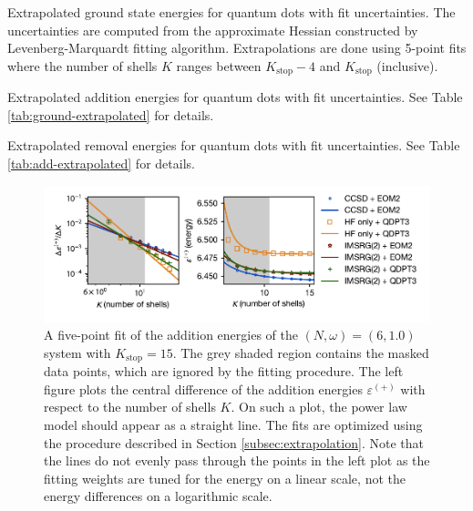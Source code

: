 \begin{table}
  \centering \caption{Extrapolated ground state energies for quantum
  dots with fit uncertainties.  The uncertainties are computed from
  the approximate Hessian constructed by Levenberg-Marquardt fitting
  algorithm.  Extrapolations are done using 5-point fits where the
  number of shells $K$ ranges between $K_{\text{stop}} - 4$ and
  $K_{\text{stop}}$
  (inclusive).}  \label{tab:ground-extrapolated} 
\end{table}

\begin{table}
  \centering
  \caption{Extrapolated addition energies for quantum dots with fit uncertainties.  See Table \ref{tab:ground-extrapolated} for details.}
  \label{tab:add-extrapolated}
  
\end{table}

\begin{table}
  \centering
  \caption{Extrapolated removal energies for quantum dots with fit uncertainties.  See Table \ref{tab:add-extrapolated} for details.}
  \label{tab:rm-extrapolated}
  
\end{table}

\begin{figure}
  \centering \includegraphics{fig-fit-2-1p0-add.pdf} \caption{A
  five-point fit of the addition energies of the $(N, \omega) = (6,
  1.0)$ system with $K_{\text{stop}} = 15$.  The grey shaded region
  contains the masked data points, which are ignored by the fitting
  procedure.  The left figure plots the central difference of the
  addition energies $\varepsilon^{(+)}$ with respect to the number of
  shells $K$.  On such a plot, the power law model should appear as a
  straight line.  The fits are optimized using the procedure described
  in Section \ref{subsec:extrapolation}.  Note that the lines do not
  evenly pass through the points in the left plot as the fitting
  weights are tuned for the energy on a linear scale, not the energy
  differences on a logarithmic scale.}  \label{fig:by-fit-2-1p0-add}
\end{figure}

